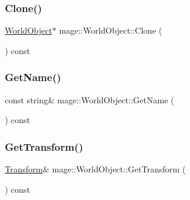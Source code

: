 \hypertarget{classmage_1_1_world_object_a6f464ec7f71740bb89a3ffb0cf6369b2}{}\label{classmage_1_1_world_object_a6f464ec7f71740bb89a3ffb0cf6369b2} 
\subsubsection{\texorpdfstring{Clone()}{Clone()}}
{\footnotesize\ttfamily \hyperlink{classmage_1_1_world_object}{World\+Object}$\ast$ mage\+::\+World\+Object\+::\+Clone (\begin{DoxyParamCaption}{ }\end{DoxyParamCaption}) const}

\hypertarget{classmage_1_1_world_object_a3aab270d50a8d9ab1f9a970d3e04245f}{}\label{classmage_1_1_world_object_a3aab270d50a8d9ab1f9a970d3e04245f} 
\subsubsection{\texorpdfstring{Get\+Name()}{GetName()}}
{\footnotesize\ttfamily const string\& mage\+::\+World\+Object\+::\+Get\+Name (\begin{DoxyParamCaption}{ }\end{DoxyParamCaption}) const}

\hypertarget{classmage_1_1_world_object_a9f0ff4d1d3b3c2dd63e91e8127023f47}{}\label{classmage_1_1_world_object_a9f0ff4d1d3b3c2dd63e91e8127023f47} 
\subsubsection{\texorpdfstring{Get\+Transform()}{GetTransform()}}
{\footnotesize\ttfamily \hyperlink{structmage_1_1_transform}{Transform}\& mage\+::\+World\+Object\+::\+Get\+Transform (\begin{DoxyParamCaption}{ }\end{DoxyParamCaption}) const}

\hypertarget{classmage_1_1_world_object_aa53dfc0e654aead5898d0cc76cbc9be6}{}\label{classmage_1_1_world_object_aa53dfc0e654aead5898d0cc76cbc9be6} 
